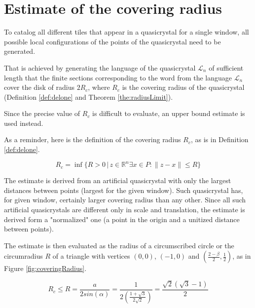 \documentclass[text.tex]{subfiles}
\begin{document}
\section{Estimate of the covering radius}
To catalog all different tiles that appear in a quasicrystal for a single window, all possible local configurations of the points of the quasicrystal need to be generated. 

That is achieved by generating the language of the quasicrystal $\mathcal{L}_n$ of sufficient length that the finite sections corresponding to the word from the language $\mathcal{L}_n$ cover the disk of radius $2R_c$, where $R_c$ is the covering radius of the quasicrystal (Definition \ref{def:delone} and Theorem \ref{the:radiusLimit}).

Since the precise value of $R_c$ is difficult to evaluate, an upper bound estimate is used instead. 

As a reminder, here is the definition of the covering radius $R_c$, as is in Definition \ref{def:delone}.

$$R_c = \inf\{R>0\,|\, z\in\mathbb{R}^n \exists x\in P: \|z-x\|\leq R\}$$

The estimate is derived from an artificial quasicrystal with only the largest distances between points (largest for the given window). Such quasicrystal has, for given window, certainly larger covering radius than any other. Since all such artificial quasicrystals are different only in scale and translation, the estimate is derived form a "normalized" one (a point in the origin and a unitized distance between points).

The estimate is then evaluated as the radius of a circumscribed circle or the circumradius $R$ of a triangle with vertices $(0,0)$, $(-1,0)$ and $\left(\frac{2-\beta}{2},\frac{1}{2}\right)$, as in Figure \ref{fig:coveringRadius}. 

$$R_c \leq R = \frac{a}{2sin(\alpha)} = \frac{1}{2\left(\frac{1+\sqrt{3}}{2\sqrt{2}}\right)} = \frac{\sqrt{2}(\sqrt{3}-1)}{2}$$
\end{document}

